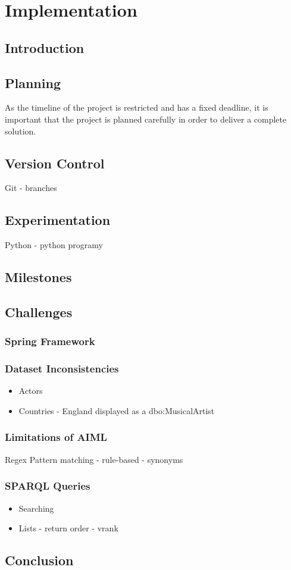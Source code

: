 \chapter{Implementation}
\label{ch:implementation}
\section{Introduction}

\section{Planning}
As the timeline of the project is restricted and has a fixed deadline, it is important that the project is planned carefully in order to deliver a complete solution. 

\section{Version Control}
Git - branches

\section{Experimentation}
Python - python programy

\section{Milestones}


\section{Challenges}
\subsection{Spring Framework}

\subsection{Dataset Inconsistencies}
\begin{itemize}
	\item Actors 
	\item Countries - England displayed as a dbo:MusicalArtist
\end{itemize}

\subsection{Limitations of AIML}
Regex
Pattern matching - rule-based - synonyms

\subsection{SPARQL Queries}
\begin{itemize}
	\item Searching
	\item Lists - return order - vrank
\end{itemize}
\section{Conclusion}


